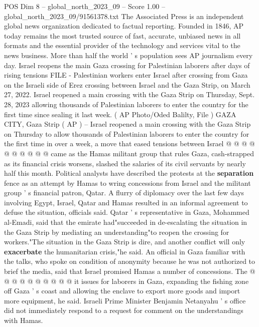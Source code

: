 \begin{textsample}{POS Dim 8 – global\_north\_2023\_09 – Score 1.00 – global\_north\_2023\_09/91561378.txt}  \label{ex:f8_pos_130}
The Associated Press is an independent global news organization dedicated to factual reporting.
Founded in 1846, AP today remains the most trusted source of fast, accurate, unbiased news in all formats and the essential provider of the technology and services vital to the news business.
More than half the world ' s population sees AP journalism every day.
Israel reopens the main Gaza crossing for Palestinian laborers after days of rising tensions FILE - Palestinian workers enter Israel after crossing from Gaza on the Israeli side of Erez crossing between Israel and the Gaza Strip, on March 27, 2022.
Israel reopened a main crossing with the Gaza Strip on Thursday, Sept. 28, 2023 allowing thousands of Palestinian laborers to enter the country for the first time since sealing it last week. ( AP Photo/Oded Balilty, File ) GAZA CITY, Gaza Strip ( AP ) -- Israel reopened a main crossing with the Gaza Strip on Thursday to allow thousands of Palestinian laborers to enter the country for the first time in over a week, a move that eased tensions between Israel @ @ @ @ @ @ @ @ @ @ came as the Hamas militant group that rules Gaza, cash-strapped as its financial crisis worsens, slashed the salaries of its civil servants by nearly half this month.
Political analysts have described the protests at the \textbf{separation} fence as an attempt by Hamas to wring concessions from Israel and the militant group ' s financial patron, Qatar.
A flurry of diplomacy over the last few days involving Egypt, Israel, Qatar and Hamas resulted in an informal agreement to defuse the situation, officials said.
Qatar ' s representative in Gaza, Mohammed al-Emadi, said that the emirate had"succeeded in de-escalating the situation in the Gaza Strip by mediating an understanding"to reopen the crossing for workers."The situation in the Gaza Strip is dire, and another conflict will only \textbf{exacerbate} the humanitarian crisis,"he said.
An official in Gaza familiar with the talks, who spoke on condition of anonymity because he was not authorized to brief the media, said that Israel promised Hamas a number of concessions.
The @ @ @ @ @ @ @ @ @ @ it issues for laborers in Gaza, expanding the fishing zone off Gaza ' s coast and allowing the enclave to export more goods and import more equipment, he said.
Israeli Prime Minister Benjamin Netanyahu ' s office did not immediately respond to a request for comment on the understandings with Hamas.

\end{textsample}
